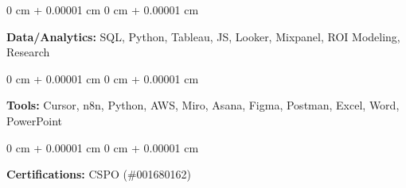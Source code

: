 \documentclass[10pt, letterpaper]{article}
\newenvironment{onecolentry}{
    \begin{adjustwidth}{
        0 cm + 0.00001 cm
    }{
        0 cm + 0.00001 cm
    }
}{
    \end{adjustwidth}
} %
\begin{document}
        \vspace{0.1 cm}

        \begin{onecolentry}
            \textbf{Data/Analytics:} SQL, Python, Tableau, JS, Looker, Mixpanel, ROI Modeling, Research
        \end{onecolentry}

        \vspace{0.1 cm}

        \begin{onecolentry}
            \textbf{Tools:} Cursor, n8n, Python, AWS, Miro, Asana, Figma, Postman, Excel, Word, PowerPoint
        \end{onecolentry}

\vspace{0.1 cm}

        \begin{onecolentry}
            \textbf{Certifications:} CSPO (\#001680162)
        \end{onecolentry}
    
\end{document}

